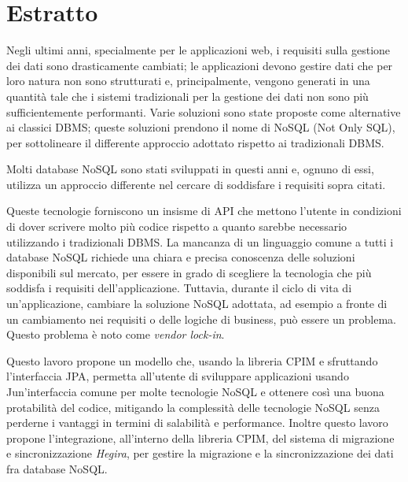 \chapter*{Estratto}
Negli ultimi anni, specialmente per le applicazioni web, i requisiti sulla gestione dei dati sono drasticamente cambiati; le applicazioni devono gestire dati che per loro natura non sono strutturati e, principalmente, vengono generati in una quantit\`{a} tale che i sistemi tradizionali per la gestione dei dati non sono più sufficientemente performanti. Varie soluzioni sono state proposte come alternative ai classici DBMS; queste soluzioni prendono il nome di NoSQL (Not Only SQL), per sottolineare il differente approccio adottato rispetto ai tradizionali DBMS.

\noindent Molti database NoSQL sono stati sviluppati in questi anni e, ognuno di essi, utilizza un approccio differente nel cercare di soddisfare i requisiti sopra citati.

\noindent Queste tecnologie forniscono un insisme di API che mettono l'utente in condizioni di dover scrivere molto pi\`{u}  codice rispetto a quanto sarebbe necessario utilizzando i tradizionali DBMS. 
La mancanza di un linguaggio comune a tutti i database NoSQL richiede una chiara e precisa conoscenza delle soluzioni disponibili sul mercato, per essere in grado di scegliere la tecnologia che pi\`{u} soddisfa i requisiti dell'applicazione. Tuttavia, durante il ciclo di vita di un'applicazione, cambiare la soluzione NoSQL adottata, ad esempio a fronte di un cambiamento nei requisiti o delle logiche di business, pu\`{o} essere un problema. Questo problema \`{e} noto come \textit{vendor lock-in}.

\noindent Questo lavoro propone un modello che, usando la libreria CPIM e sfruttando l'interfaccia JPA, permetta all'utente di sviluppare applicazioni usando Jun'interfaccia comune per molte tecnologie NoSQL e ottenere cos\`{i} una buona protabilit\`{a} del codice, mitigando la complessit\`{a} delle tecnologie NoSQL senza perderne i vantaggi in termini di salabilit\`{a} e performance. Inoltre questo lavoro propone l'integrazione, all'interno della libreria CPIM, del sistema di migrazione e sincronizzazione \textit{Hegira}, per gestire la migrazione e la sincronizzazione dei dati fra database NoSQL.

\cleardoublepage
